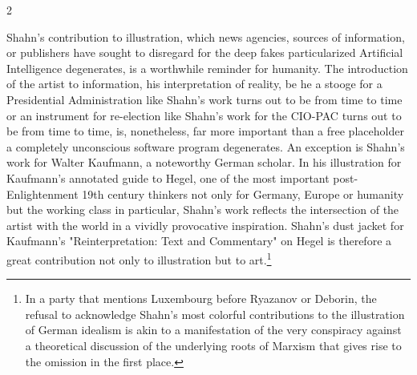 \documentclass[10pt,a4paper,twoside]{article} %
\begin{document}
\begin{multicols}{2}
{{\newline \indent Shahn's contribution to illustration, which news agencies, sources of information, or publishers have sought to disregard for the deep fakes particularized Artificial Intelligence degenerates, is a worthwhile reminder for humanity. The introduction of the artist to information, his interpretation of reality, be he a stooge for a Presidential Administration like Shahn's work turns out to be from time to time or an instrument for re-election like Shahn's work for the CIO-PAC turns out to be from time to time, is, nonetheless, far more important than a free placeholder a completely unconscious software program degenerates. An exception is Shahn's work for Walter Kaufmann, a noteworthy German scholar. In his illustration for Kaufmann's annotated guide to Hegel, one of the most important post-Enlightenment 19th century thinkers not only for Germany, Europe or humanity but the working class in particular, Shahn's work reflects the intersection of the artist with the world in a vividly provocative inspiration. Shahn's dust jacket for Kaufmann's "Reinterpretation: Text and Commentary" on Hegel is therefore a great contribution not only to illustration but to art.\footnote{In a party that mentions Luxembourg before Ryazanov or Deborin, the refusal to acknowledge Shahn's most colorful contributions to the illustration of German idealism is akin to a manifestation of the very conspiracy against a theoretical discussion of the underlying roots of Marxism that gives rise to the omission in the first place.}
}





}
\end{multicols}
\end{document}
